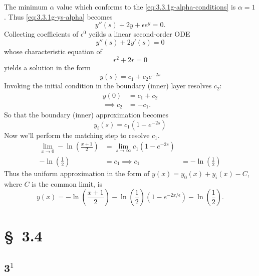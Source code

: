 \documentclass[12pt,twoside]{article}
\begin{document}
The minimum $\alpha$ value which conforms to the
\cref{eq:3.3.1g-alpha-conditions} is $\alpha=1$. Thus \cref{eq:3.3.1g-ys-alpha}
becomes
\begin{equation*}
  \label{eq:3.3.1g-ys}
  y''(s) + 2y + \epsilon e^y=0.
\end{equation*}
Collecting coefficients of $\epsilon^0$ yeilds a linear second-order ODE\@
\begin{equation*}
  y''(s) + 2y'(s) = 0
\end{equation*}
whose characteristic equation of
\begin{equation*}
  r^2+2r=0
\end{equation*}
yields a solution in the form
\begin{equation*}
  y(s) = c_1 + c_2e^{-2s}
\end{equation*}
Invoking the initial condition in the boundary (inner) layer resolves $c_2$:
\begin{equation*}
  \begin{aligned}
    y(0) &= c_1+c_2 \\
    \implies c_2 &= -c_1.
  \end{aligned}
\end{equation*}
So that the boundary (inner) approximation becomes
\begin{equation*}
  \boxed{y_i(s) = c_1(1-e^{-2s})}
\end{equation*}
Now we'll perform the matching step to resolve $c_1$.
\begin{equation*}
  \begin{aligned}
    \lim_{x\rightarrow0}-\ln\left(\frac{x+1}{2}\right) &= \lim_{s\rightarrow\infty}c_1(1-e^{-2s}) \\
    -\ln\left(\frac{1}{2}\right) &= c_1
    \implies c_1 &= -\ln\left(\frac{1}{2}\right)
  \end{aligned}
\end{equation*}
Thus the uniform approximation in the form of $y(x)=y_0(x)+y_i(x)-C$, where $C$
is the common limit, is
\begin{equation*}
  \boxed{y(x)=-\ln\left( \frac{x+1}{2} \right) -
    \ln\left(\frac{1}{2}\right)(1-e^{-2x/\epsilon}) -
    \ln\left( \frac{1}{2} \right).}
\end{equation*}

\section{\S~3.4}
\subsection{3$^1$}
\end{document}
